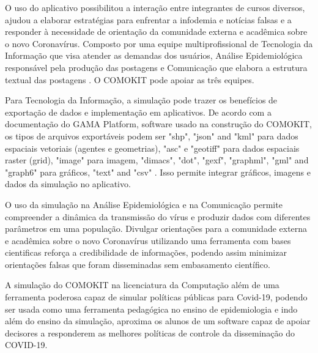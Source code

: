 O uso do aplicativo possibilitou a interação entre integrantes de cursos diversos, ajudou a elaborar estratégias para enfrentar a infodemia e notícias falsas e a responder à necessidade de orientação da comunidade externa e acadêmica sobre o novo Coronavírus. Composto por uma equipe multiprofissional de Tecnologia da Informação que visa atender as demandas dos usuários, Análise Epidemiológica responsável pela produção das postagens e Comunicação que elabora a estrutura textual das postagens \cite{oliveira2021equipe}. O COMOKIT pode apoiar as três equipes.

Para Tecnologia da Informação, a simulação pode trazer os benefícios de exportação de dados e implementação em aplicativos. De acordo com a documentação do GAMA Platform, software usado na construção do COMOKIT, os tipos de arquivos exportáveis podem ser "shp", "json" and "kml" para dados espaciais vetoriais (agentes e geometrias), "asc" e "geotiff" para dados espaciais raster (grid), "image" para imagem, "dimacs", "dot", "gexf", "graphml", "gml" and "graph6" para gráficos, "text" and "csv" \cite{GamaWiki:online}. Isso permite integrar gráficos, imagens e dados da simulação no aplicativo.

O uso da simulação na Análise Epidemiológica e na Comunicação permite compreender a dinâmica da transmissão do vírus e produzir dados com diferentes parâmetros em uma população. Divulgar orientações para a comunidade externa e acadêmica sobre o novo Coronavírus utilizando uma ferramenta com bases cientificas reforça a credibilidade de informações, podendo assim minimizar orientações falsas que foram disseminadas sem embasamento científico.

A simulação do COMOKIT na licenciatura da Computação além de uma ferramenta poderosa capaz de simular políticas públicas para Covid-19, podendo ser usada como uma ferramenta pedagógica no ensino de epidemiologia e indo além do ensino da simulação, aproxima os alunos de um software capaz de apoiar decisores a responderem as melhores políticas de controle da disseminação do COVID-19.











